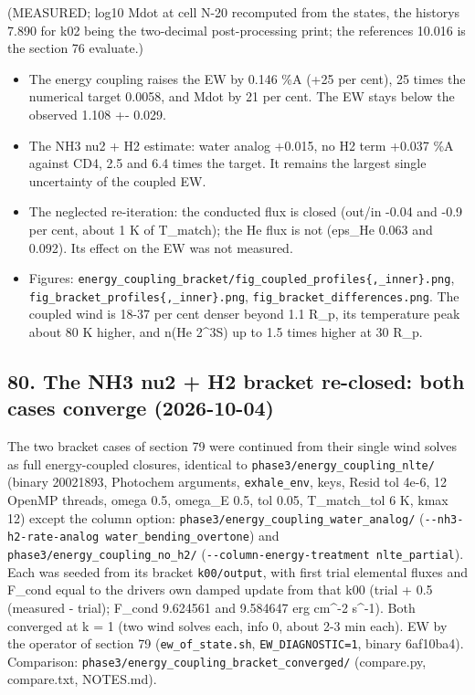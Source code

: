 \documentclass[english,a4paper]{my_memo}
\providecommand{\tightlist}{\setlength{\itemsep}{0pt}\setlength{\parskip}{0pt}}
\begin{document}
(MEASURED; log10 Mdot at cell N-20 recomputed from the states, the history\textquotesingle s
7.890 for k02 being the two-decimal post-processing print; the reference\textquotesingle s
10.016 is the section 76 evaluate.)

\begin{itemize}
\tightlist
\item
  The energy coupling raises the EW by 0.146 \%A (+25 per cent), 25 times
  the numerical target 0.0058, and Mdot by 21 per cent. The EW stays below
  the observed 1.108 +- 0.029.
\item
  The NH3 nu2 + H2 estimate: water analog +0.015, no H2 term +0.037 \%A
  against CD4, 2.5 and 6.4 times the target. It remains the largest single
  uncertainty of the coupled EW.
\item
  The neglected re-iteration: the conducted flux is closed (out/in -0.04
  and -0.9 per cent, about 1 K of T\_match); the He flux is not (eps\_He
  0.063 and 0.092). Its effect on the EW was not measured.
\item
  Figures: \texttt{energy\_coupling\_bracket/fig\_coupled\_profiles\{,\_inner\}.png},
  \texttt{fig\_bracket\_profiles\{,\_inner\}.png}, \texttt{fig\_bracket\_differences.png}. The
  coupled wind is 18-37 per cent denser beyond 1.1 R\_p, its temperature
  peak about 80 K higher, and n(He 2\^{}3S) up to 1.5 times higher at 30 R\_p.
\end{itemize}

\subsection{80. The NH3 nu2 + H2 bracket re-closed: both cases converge (2026-10-04)}\label{80-the-nh3-nu2--h2-bracket-re-closed-both-cases-converge-2026-10-04}

The two bracket cases of section 79 were continued from their single wind
solves as full energy-coupled closures, identical to
\texttt{phase3/energy\_coupling\_nlte/} (binary 20021893, Photochem arguments,
\texttt{exhale\_env}, keys, Resid tol 4e-6, 12 OpenMP threads, omega 0.5, omega\_E
0.5, tol 0.05, T\_match\_tol 6 K, kmax 12) except the column option:
\texttt{phase3/energy\_coupling\_water\_analog/} (\texttt{-\/-nh3-h2-rate-analog\ water\_bending\_overtone}) and \texttt{phase3/energy\_coupling\_no\_h2/}
(\texttt{-\/-column-energy-treatment\ nlte\_partial}). Each was seeded from its
bracket \texttt{k00/output}, with first trial elemental fluxes and F\_cond equal to
the driver\textquotesingle s own damped update from that k00 (trial + 0.5 (measured -
trial); F\_cond 9.624561 and 9.584647 erg cm\^{}-2 s\^{}-1). Both converged at
k = 1 (two wind solves each, info 0, about 2-3 min each). EW by the operator
of section 79 (\texttt{ew\_of\_state.sh}, \texttt{EW\_DIAGNOSTIC=1}, binary 6af10ba4).
Comparison: \texttt{phase3/energy\_coupling\_bracket\_converged/} (compare.py,
compare.txt, NOTES.md).
\end{document}
